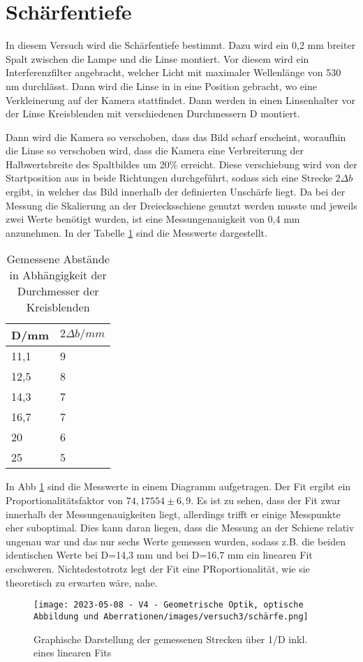 \documentclass[../protokoll.tex]{subfiles}
\begin{document}
\section{Schärfentiefe}
In diesem Versuch wird die Schärfentiefe bestimmt. Dazu wird ein 0,2 mm breiter Spalt zwischen die Lampe und die Linse montiert. Vor diesem wird ein Interferenzfilter angebracht, welcher Licht mit maximaler Wellenlänge von 530 nm durchlässt. Dann wird die Linse in in eine Position gebracht, wo eine Verkleinerung auf der Kamera stattfindet. Dann werden in einen Linsenhalter vor der Linse Kreisblenden mit verschiedenen Durchmessern D montiert.

Dann wird die Kamera so verschoben, dass das Bild scharf erscheint, woraufhin die Linse so verschoben wird, dass die Kamera eine Verbreiterung der Halbwertsbreite des Spaltbildes um 20\% erreicht. Diese verschiebung wird von der Startposition aus in beide Richtungen durchgeführt, sodass sich eine Strecke $2\Delta b$ ergibt, in welcher das Bild innerhalb der definierten Unschärfe liegt. Da bei der Messung die Skalierung an der Dreiecksschiene genutzt werden musste und jeweils zwei Werte benötigt wurden, ist eine Messungenauigkeit von 0,4 mm anzunehmen. In der Tabelle \ref{tab31} sind die Messwerte dargestellt.
\begin{table}[h]
\centering
\begin{tabular}{|l|l|}
\hline
D/mm &  $2\Delta b/mm$   \\ \hline
11,1 & 9 \\ \hline
12,5 & 8 \\ \hline
14,3 & 7 \\ \hline
16,7 & 7 \\ \hline
20   & 6 \\ \hline
25   & 5 \\ \hline
\end{tabular}
\caption{Gemessene Abstände in Abhängigkeit der Durchmesser der Kreisblenden}
\label{tab31}
\end{table}
In Abb \ref{abb31} sind die Messwerte in einem Diagramm aufgetragen. Der Fit ergibt ein Proportionalitätsfaktor von $74,17554\pm6,9$. Es ist zu sehen, dass der Fit zwar innerhalb der Messungenauigkeiten liegt, allerdings trifft er einige Messpunkte eher suboptimal. Dies kann daran liegen, dass die Messung an der Schiene relativ ungenau war und das nur sechs Werte gemessen wurden, sodass z.B. die beiden identischen Werte bei D=14,3 mm und bei D=16,7 mm ein linearen Fit erschweren. Nichtsdestotrotz legt der Fit eine PRoportionalität, wie sie theoretisch zu erwarten wäre, nahe.
\begin{figure}[h!]
    \centering
    \texttt{[image: 2023-05-08 - V4 - Geometrische Optik, optische Abbildung und Aberrationen/images/versuch3/schärfe.png]}
    \caption{Graphische Darstellung der gemessenen Strecken über 1/D inkl. eines linearen Fits}
    \label{abb31}
\end{figure}
\end{document}
